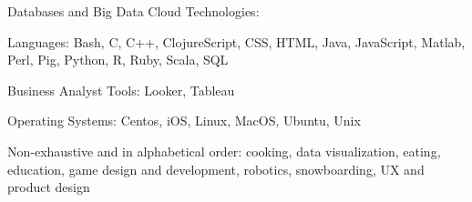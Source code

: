 \documentclass[10pt,a4paper]{article}
\begin{document}
\headedsubsection
  {Databases and Big Data Cloud Technologies:} {}
  {}

\inlineheadsection
  {Languages:}
  {Bash, C, C++, ClojureScript, CSS, HTML, Java, JavaScript, Matlab, Perl, Pig, Python, R, Ruby, Scala, SQL}

\inlineheadsection
  {Business Analyst Tools:}
  {Looker, Tableau}

\inlineheadsection
  {Operating Systems:}
  {Centos, iOS, Linux, MacOS, Ubuntu, Unix}

\spacedhrule{1.6em}{-0.4em}


\inlineheadsection
  {Non-exhaustive and in alphabetical order:}
  {cooking, data visualization, eating, education, game design and development, robotics, snowboarding, UX and product design}
\end{document}
